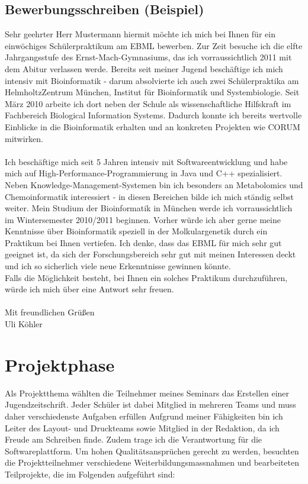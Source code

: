 \documentclass[a4paper,12pt,oneside]{scrbook}
\begin{document}
\section{Bewerbungsschreiben (Beispiel)}
Sehr geehrter Herr Mustermann
hiermit möchte ich mich bei Ihnen für ein einwöchiges Schülerpraktikum am EBML bewerben.
Zur Zeit besuche ich die elfte Jahrgangsstufe des Ernst-Mach-Gymnasiums, das ich vorraussichtlich 2011 mit dem Abitur verlassen werde.
Bereits seit meiner Jugend beschäftige ich mich intensiv mit Bioinformatik - darum absolvierte ich auch zwei Schülerpraktika am HelmholtzZentrum München, Institut für Bioinformatik und Systembiologie.
Seit März 2010 arbeite ich dort neben der Schule als wissenschaftliche Hilfskraft im Fachbereich Biological Information Systems. Dadurch konnte ich bereits wertvolle Einblicke in die Bioinformatik erhalten und an konkreten Projekten wie CORUM mitwirken.\\\\
Ich beschäftige mich seit 5 Jahren intensiv mit Softwareentwicklung und habe mich auf High-Performance-Programmierung in Java und C++ spezialisiert.
Neben Knowledge-Management-Systemen bin ich besonders an Metabolomics und Chemoinformatik interessiert - in diesen Bereichen bilde ich mich ständig selbst weiter.
Mein Studium der Bioinformatik in München werde ich vorraussichtlich im Wintersemester 2010/2011 beginnen.
Vorher würde ich aber gerne meine Kenntnisse über Bioinformatik speziell in der Molkulargenetik durch ein Praktikum bei Ihnen vertiefen.
Ich denke, dass das EBML für mich sehr gut geeignet ist, da sich der Forschungsbereich sehr gut mit meinen Interessen deckt und ich so sicherlich viele neue Erkenntnisse gewinnen könnte.\\
Falls die Möglichkeit besteht, bei Ihnen ein solches Praktikum durchzuführen, würde ich mich über eine Antwort sehr freuen.\\\\
Mit freundlichen Grüßen\\
Uli Köhler
\chapter{Projektphase}
Als Projektthema wählten die Teilnehmer meines Seminars das Erstellen einer Jugendzeitschrift.
Jeder Schüler ist dabei Mitglied in mehreren Teams und muss daher verschiedenste Aufgaben erfüllen
Aufgrund meiner Fähigkeiten bin ich Leiter des Layout- und Druckteams sowie Mitglied in der Redaktion, da ich Freude am Schreiben finde.
Zudem trage ich die Verantwortung für die Softwareplattform.
Um hohen Qualitätsansprüchen gerecht zu werden, besuchten die Projektteilnehmer verschiedene Weiterbildungsmassnahmen und bearbeiteten Teilprojekte, die im Folgenden aufgeführt sind:
\end{document}

